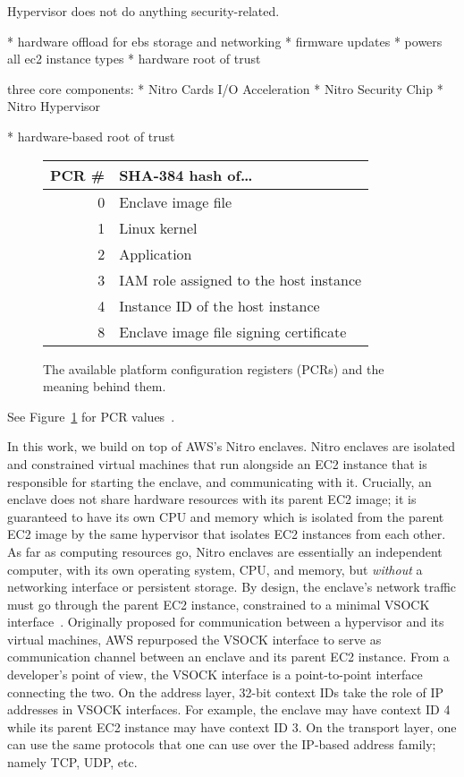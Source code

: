 Hypervisor does not do anything security-related.

\cite{enclave-talk}




* hardware offload for ebs storage and networking
* firmware updates
* powers all ec2 instance types
* hardware root of trust

three core components:
* Nitro Cards I/O Acceleration
* Nitro Security Chip
* Nitro Hypervisor

* hardware-based root of trust


\begin{figure}[t]
    \centering
    \begin{tabular}{r l}
    \toprule
      PCR \# & SHA-384 hash of\ldots \\
    \midrule
      0 & Enclave image file \\
      1 & Linux kernel \\
      2 & Application \\
      3 & IAM role assigned to the host instance \\
      4 & Instance ID of the host instance \\
      8 & Enclave image file signing certificate \\
    \bottomrule
    \end{tabular}
    \caption{The available platform configuration registers (PCRs) and the
    meaning behind them.}
    \label{fig:pcr}
\end{figure}

See Figure~\ref{fig:pcr} for PCR values~\cite{pcrs}.


In this work, we build on top of AWS's Nitro enclaves.  Nitro enclaves are
isolated and constrained virtual machines that run alongside an EC2 instance
that is responsible for starting the enclave, and communicating with it.
Crucially, an enclave does not share hardware resources with its parent EC2
image; it is guaranteed to have its own CPU and memory which is
isolated from the parent EC2 image by the same hypervisor that isolates EC2
instances from each other.
As far as computing resources go, Nitro enclaves are essentially an independent
computer, with its own operating system, CPU, and memory, but \emph{without} a
networking interface or persistent storage.  By design, the enclave's network
traffic must go through the parent EC2 instance, constrained to a minimal VSOCK
interface~\cite{vsock}. Originally proposed for communication between a
hypervisor and its virtual machines, AWS repurposed the VSOCK interface to serve
as communication channel between an enclave and its parent EC2 instance.  From a
developer's point of view, the VSOCK interface is a point-to-point interface
connecting the two.  On the address layer, 32-bit
context IDs take the role of IP addresses in VSOCK interfaces.  For example, the
enclave may have context ID 4 while its parent EC2 instance may have context ID
3.  On the transport layer, one can use the same protocols that one can use over
the IP-based address family; namely TCP, UDP, etc.

